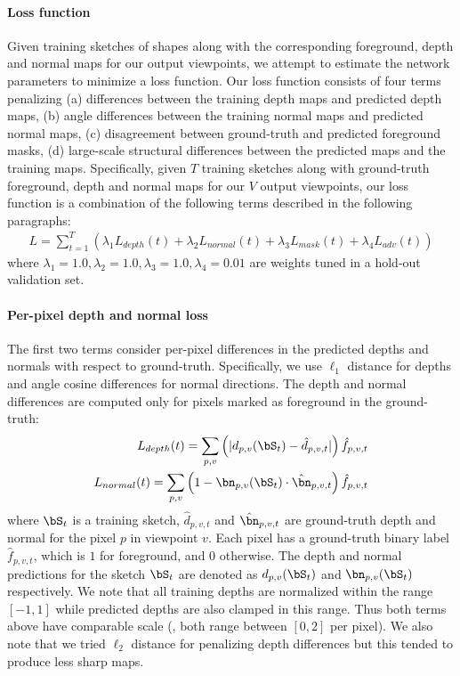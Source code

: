 \documentclass[10pt, conference, compsocconf]{IEEEtran}
\begin{document}
\vspace{-1mm}\paragraph{Loss function} Given training sketches of shapes along with the corresponding foreground, depth and normal maps for our output viewpoints, we attempt to estimate the network parameters to minimize a loss function. 
Our loss function  consists of four terms penalizing (a) 
differences between the training depth maps and predicted depth maps,  (b) angle differences between the training normal maps and predicted normal maps, 
(c) disagreement between ground-truth and predicted foreground masks, (d) large-scale structural  differences between the predicted maps and the training maps. Specifically, given $T$ training sketches along with ground-truth foreground, depth and normal maps for our $V$ output viewpoints, our loss function is a combination of the following terms described  in the following paragraphs:
\vspace{-2mm}\begin{align}
\!\!L\!=\!\!\sum\limits_{t=1}^T\!\!\left(\lambda_1L_{depth} (t)\!+\!\!\lambda_2L_{normal}(t)\!+\!\!\lambda_3L_{mask}(t)\!+\!\!\lambda_4L_{adv}(t)\right) \nonumber
\end{align}\vskip -3mm
where $\lambda_1=1.0,\lambda_2=1.0,\lambda_3=1.0,\lambda_4=0.01$ are weights tuned in a hold-out validation set.

\vspace{-1mm}\paragraph{Per-pixel depth and normal loss}  The first two terms consider  per-pixel differences in the predicted depths and normals with respect to ground-truth. Specifically, we use $\ell_1$ distance for depths and angle cosine differences for normal directions. The depth and normal differences are computed only for pixels marked as foreground in the ground-truth:
\vspace{-1mm}\begin{align}
L_{depth} (t)= \sum_{p,v} \left(| d_{p,v}(\bS_t) - \hat{d}_{p,v,t}|\right) \hat{f}_{p,v,t} \nonumber \\
L_{normal} (t)= \sum_{p,v} \left(1 - \bn_{p,v}(\bS_t) \cdot \hat{\bn}_{p,v,t}\right) \hat{f}_{p,v,t} \nonumber
\end{align}\vskip -5mm
where $\bS_t$ is a training sketch, $\hat{d}_{p,v,t}$ and $\hat{\bn}_{p,v,t}$ are ground-truth depth and normal for the pixel $p$ in viewpoint $v$. Each pixel has a ground-truth binary label $\hat{f}_{p,v,t}$, which is $1$ for foreground, and $0$ otherwise. The depth and normal predictions for the sketch $\bS_t$ are denoted as $d_{p,v}(\bS_t)$  and $\bn_{p,v}(\bS_t)$ respectively. We note that all training depths are normalized within the range $[-1,1]$ while predicted depths are also clamped in this range. Thus both terms above have comparable scale (\ie, both range between $[0,2]$ per pixel). We also note that we tried $\ell_2$ distance for penalizing depth differences but this tended to produce less sharp maps.
\end{document}
